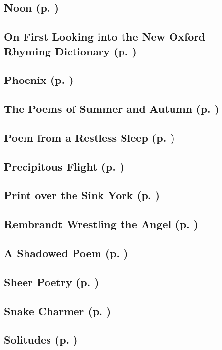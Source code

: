 \subsection*{Noon (p. \pageref{ch:noon})}
\subsection*{On First Looking into the New Oxford Rhyming Dictionary (p. \pageref{ch:on_first_looking})}
\subsection*{Phoenix (p. \pageref{ch:phoenix})}
\subsection*{The Poems of Summer and Autumn (p. \pageref{ch:the_poems_of_summer})}
\subsection*{Poem from a Restless Sleep (p. \pageref{ch:poem_from_a_restless_sleep})}
\subsection*{Precipitous Flight (p. \pageref{ch:precipitous_flight})}
\subsection*{Print over the Sink York (p. \pageref{ch:print_over_the_sink_york})}
\subsection*{Rembrandt Wrestling the Angel (p. \pageref{ch:rembrandt_wrestling})}
\subsection*{A Shadowed Poem (p. \pageref{ch:a_shadowed_poem})}
\subsection*{Sheer Poetry (p. \pageref{ch:sheer_poetry})}
\subsection*{Snake Charmer (p. \pageref{ch:snake_charmer})}
\subsection*{Solitudes (p. \pageref{ch:solitudes})}
